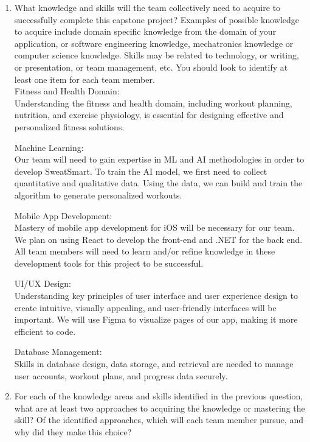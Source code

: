 \documentclass[12pt]{article}
\begin{document}
\begin{enumerate}
  \item What knowledge and skills will the team collectively need to acquire to
  successfully complete this capstone project?  Examples of possible knowledge
  to acquire include domain specific knowledge from the domain of your
  application, or software engineering knowledge, mechatronics knowledge or
  computer science knowledge.  Skills may be related to technology, or writing,
  or presentation, or team management, etc.  You should look to identify at
  least one item for each team member.\\

Fitness and Health Domain:\\
Understanding the fitness and health domain, including workout planning, nutrition, and exercise physiology, is essential for designing effective and personalized fitness solutions.

Machine Learning:\\
Our team will need to gain expertise in ML and AI methodologies in order to develop SweatSmart. To train the AI model, we first need to collect quantitative and qualitative data. Using the data, we can build and train the algorithm to generate personalized workouts.

Mobile App Development:\\
Mastery of mobile app development for iOS will be necessary for our team. We plan on using React to develop the front-end and .NET for the back end. All team members will need to learn and/or refine knowledge in these development tools for this project to be successful.

UI/UX Design:\\
Understanding key principles of user interface and user experience design to create intuitive, visually appealing, and user-friendly interfaces will be important. We will use Figma to visualize pages of our app, making it more efficient to code.

Database Management:\\
Skills in database design, data storage, and retrieval are needed to manage user accounts, workout plans, and progress data securely.

  \item For each of the knowledge areas and skills identified in the previous
  question, what are at least two approaches to acquiring the knowledge or
  mastering the skill?  Of the identified approaches, which will each team
  member pursue, and why did they make this choice?



\end{enumerate}
\end{document}
